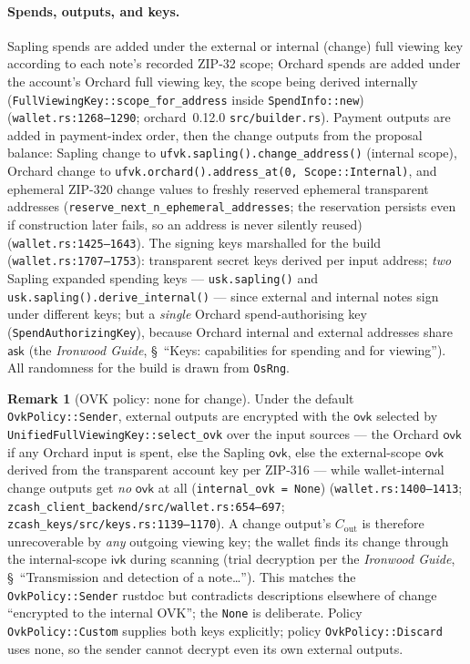 \documentclass[11pt,a4paper]{article}
\theoremstyle{definition}
\newtheorem{remark}[theorem]{Remark}
\newcommand{\ask}{\ensuremath{\mathsf{ask}}}
\newcommand{\ivk}{\ensuremath{\mathsf{ivk}}}
\newcommand{\ovk}{\ensuremath{\mathsf{ovk}}}
\begin{document}
\paragraph{Spends, outputs, and keys.} Sapling spends are added under the
external or internal (change) full viewing key according to each note's
recorded ZIP-32 scope; Orchard spends are added under the account's Orchard
full viewing key, the scope being derived internally
(\texttt{FullViewingKey::scope\_for\_address} inside
\texttt{SpendInfo::new}) (\texttt{wallet.rs:1268--1290};
\textsf{orchard}~0.12.0 \texttt{src/builder.rs}). Payment outputs are added
in payment-index order, then the change outputs from the proposal balance:
Sapling change to \texttt{ufvk.sapling().change\_address()} (internal
scope), Orchard change to
\texttt{ufvk.orchard()}\allowbreak\texttt{.address\_at(0, Scope::Internal)},
and ephemeral ZIP-320 change values to freshly reserved
ephemeral transparent addresses
(\texttt{reserve\_next\_n\_ephemeral\_addresses}; the reservation persists
even if construction later fails, so an address is never silently reused)
(\texttt{wallet.rs:1425--1643}). The signing keys marshalled for the build
(\texttt{wallet.rs:1707--1753}): transparent secret keys derived per input
address; \emph{two} Sapling expanded spending keys ---
\texttt{usk.sapling()} and \texttt{usk.sapling().derive\_internal()} ---
since external and internal notes sign under different keys; but a
\emph{single} Orchard spend-authorising key
(\texttt{SpendAuthorizingKey}), because Orchard internal and external
addresses share $\ask$ (the \emph{Ironwood Guide},
\S~``Keys: capabilities for spending and for viewing''). All randomness for
the build is drawn from \texttt{OsRng}.

\begin{remark}[OVK policy: none for change]\label{rem:ovk-none}
Under the default \texttt{OvkPolicy::Sender}, external outputs are encrypted
with the $\ovk$ selected by
\texttt{UnifiedFullViewingKey::select\_ovk} over the input sources --- the
Orchard $\ovk$ if any Orchard input is spent, else the Sapling $\ovk$, else
the external-scope $\ovk$ derived from the transparent account key per
ZIP-316 --- while wallet-internal change
outputs get \emph{no} $\ovk$ at all (\texttt{internal\_ovk = None})
(\texttt{wallet.rs:1400--1413};
\texttt{zcash\_client\_backend/}\allowbreak\texttt{src/wallet.rs:654--697};
\texttt{zcash\_keys/src/keys.rs:1139--1170}). A change output's
$C_{\mathrm{out}}$ is therefore unrecoverable by \emph{any} outgoing viewing
key; the wallet finds its change through the internal-scope $\ivk$ during
scanning (trial decryption per the \emph{Ironwood Guide},
\S~``Transmission and detection of a note\dots''). This matches the
\texttt{OvkPolicy::Sender} rustdoc but contradicts descriptions elsewhere of
change ``encrypted to the internal OVK''; the \texttt{None} is deliberate.
Policy \texttt{OvkPolicy::Custom} supplies both keys explicitly; policy
\texttt{OvkPolicy::Discard} uses none, so the sender cannot decrypt even
its own external outputs.
\end{remark}
\end{document}
